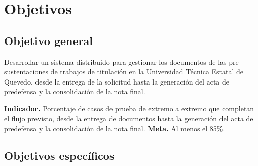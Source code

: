 \section{Objetivos}

\subsection{Objetivo general}

Desarrollar un sistema distribuido para gestionar los documentos de las
pre-sustentaciones de trabajos de titulación en la Universidad Técnica Estatal
de Quevedo, desde la entrega de la solicitud hasta la generación del acta
de predefensa y la consolidación de la nota final.

\textbf{Indicador.} Porcentaje de casos de prueba de extremo a extremo que
completan el flujo previsto, desde la entrega de documentos hasta la generación
del acta de predefensa y la consolidación de la nota final. \textbf{Meta.} Al menos el 85\%.

\subsection{Objetivos específicos}

